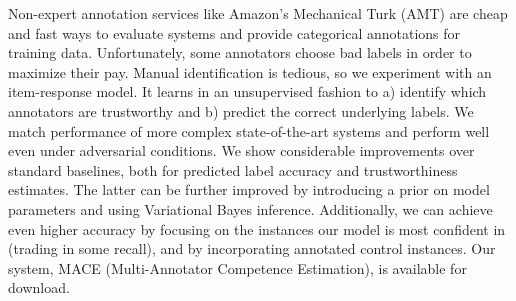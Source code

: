 Non-expert annotation services like Amazon's Mechanical Turk (AMT) are cheap and fast ways to evaluate systems and provide categorical annotations for
 training data. Unfortunately, some annotators choose bad labels in order to
 maximize their pay. Manual identification is tedious, so we experiment with an
 item-response model. It learns in an unsupervised fashion to a) identify which
 annotators are trustworthy and b) predict the correct underlying labels. We
 match performance of more complex state-of-the-art systems and perform well
 even under adversarial conditions. We show considerable improvements over
 standard baselines, both for predicted label accuracy and trustworthiness
 estimates. The latter can be further improved by introducing a prior on model
 parameters and using Variational Bayes inference. Additionally, we can achieve
 even higher accuracy by focusing on the instances our model is most confident
 in (trading in some recall), and by incorporating annotated control instances.
 Our system, MACE (Multi-Annotator Competence Estimation), is available for
 download.

